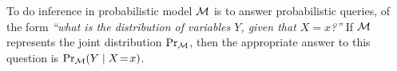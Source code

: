 \documentclass[twoside]{article}
\begin{document}
%
To do inference in probabilistic model $\cal M$ is to answer probabilistic queries, of the form
\textit{``what is the distribution of variables $Y$, given that $X\!=\!x$?''}
%
If $\cal M$ represents the joint distribution $\Pr_{\cal M}$, then the
appropriate answer to this question is $\Pr_{\cal M}(Y \mid X\!=\!x)$.
\end{document}
